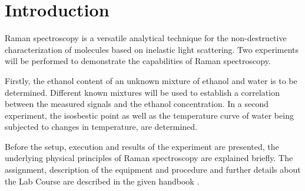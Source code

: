 
\chapter{Introduction}
\label{chap:intro}

Raman spectroscopy is a versatile analytical technique for the non-destructive characterization of molecules based on inelastic light scattering. Two experiments will be performed to demonstrate the capabilities of Raman spectroscopy.

Firstly, the ethanol content of an unknown mixture of ethanol and water is to be determined. Different known mixtures will be used to establish a correlation between the measured signals and the ethanol concentration. In a second experiment, the isosbestic point as well as the temperature curve of water being subjected to changes in temperature, are determined.

Before the setup, execution and results of the experiment are presented, the underlying physical principles of Raman spectroscopy are explained briefly. The assignment, description of the equipment and procedure and further details about the Lab Course are described in the given handbook \autocite{brauerApplicationRamanSpectroscopy2022}.
